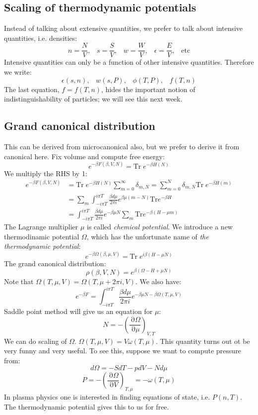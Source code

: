 \documentclass[12 pt]{article}
\DeclareMathOperator {\p} {\partial}
\begin{document}
\subsection*{Scaling of thermodynamic potentials}
Instead of talking about extensive quantities, we prefer to talk about intensive quantities, i.e. densities:
\[        n = \frac{N}{V},  \;\;\; s = \frac{S}{V},  \;\;\; w = \frac{W}{V}, \;\;\; \epsilon = \frac{E}{V},  \;\;\; \text{etc}       \]
Intensive quantities can only be a function of other intensive quantities. Therefore we write:
\[       \epsilon(s,n) , \;\;\; w(s, P) , \;\;\; \phi(T,P), \;\;\; f(T,n)      \]
The last equation, $f = f(T,n)$, hides the important notion of indistinguishability of particles; we will see this next week.

\subsection*{Grand canonical distribution}
This can be derived from microcanonical also, but we prefer to derive it from canonical here. Fix volume and compute free energy:
\[     e^{-\beta F(\beta,V,N)}  = \text{Tr}\; e^{-\beta H(N)}   \]
We multiply the RHS by 1:
\begin{align*}     e^{-\beta F(\beta,V,N)}  &= \text{Tr}\; e^{-\beta H(N)}  \sum_{m=0}^{\infty} \delta_{m,N}   = \sum_{m=0}^{N} \delta_{m,N} \text{Tr} \; e^{-\beta H(m)}  \\  
&= \sum_{m} \int_{-i\pi T}^{i\pi T} \frac{\beta d\mu}{2\pi i} e^{\beta \mu (m-N)} \text{Tr} e^{-\beta H}  \\
&= \int_{-i\pi T}^{i\pi T} \frac{\beta d\mu}{2\pi i} e^{-\beta \mu N} \sum_{m}  \text{Tr} e^{-\beta (H- \mu m)}
\end{align*}
The Lagrange multiplier $\mu$ is called \emph{chemical potential}. We introduce a new thermodinamic potential $\Omega$, which has the unfortunate name of \emph{the thermodynamic potential}:
\[   e^{- \beta \Omega(\beta , \mu,V)} = \text{Tr} \; e^{i\beta (H - \mu N)}    \]
The grand canonical distribution:
\[    \rho(\beta, V, N) = e^{\beta(\Omega - H + \mu N)}      \]
Note that $\Omega(T, \mu, V) = \Omega (T,\mu + 2\pi i , V)$. We also have:
\[       e^{-\beta F} =     \int_{-i\pi T}^{i\pi T} \frac{\beta d\mu}{2\pi i} e^{- \beta \mu N - \beta \Omega(T,\mu,V)}   \]
Saddle point method will give us an equation for $\mu$:
\[       N = - \left( \frac{\p \Omega}{\p \mu} \right)_{V,T}       \]
We can do scaling of $\Omega$. $\Omega(T,\mu, V) = V \omega(T, \mu)$. This quantity turns out ot be very funny and very useful. To see this, suppose we want to compute pressure from:
\[       d\Omega = - S dT - p dV - N d\mu       \]
\[     P = - \left( \frac{\p \Omega}{\p V} \right)_{T,\mu}  = - \omega(T, \mu)   \]
In plasma physics one is interested in finding equations of state, i.e. $P(n,T)$. The thermodynamic potential gives this to us for free.
\end{document}
